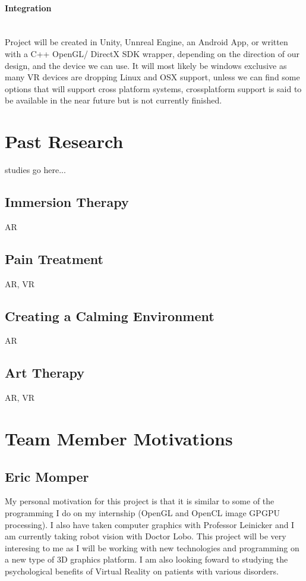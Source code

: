 \documentclass[a4paper,10pt]{article}
\begin{document}
\paragraph{Integration} ~\\ Project will be created in Unity, Unnreal Engine, an Android App, or written with a C++ OpenGL/ DirectX SDK wrapper, depending on the direction of our design, and 
the device we can use. It will most likely be windows exclusive as many VR devices are dropping Linux and OSX support, unless we can find some options that will 
support cross platform systems, crossplatform support is said to be available in the near future but is not currently finished.  

\pagebreak

\section{Past Research}
studies go here...
\subsection{Immersion Therapy}
AR
\subsection{Pain Treatment}
AR, VR
\subsection{Creating a Calming Environment}
AR
\subsection{Art Therapy}
AR, VR
\pagebreak

\section{Team Member Motivations}
\subsection{Eric Momper}
My personal motivation for this project is that it is similar to some of the programming I do on my internship (OpenGL and OpenCL image GPGPU processing).
I also have taken computer graphics with Professor Leinicker and I am currently taking robot vision with Doctor Lobo. This project will be very interesing to me as  
I will be working with new technologies and programming on a new type of 3D graphics platform. I am also looking foward to studying the psychological benefits
of Virtual Reality on patients with various disorders.  
\end{document}
